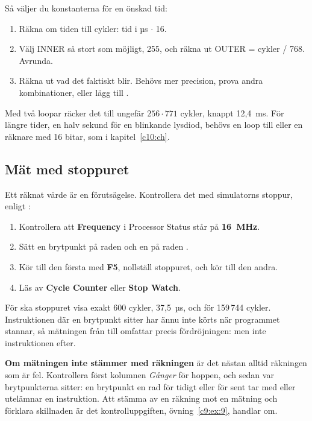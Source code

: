 Så väljer du konstanterna för en önskad tid:
\begin{enumerate}
  \item Räkna om tiden till cykler: tid i µs $\cdot$ 16.
  \item Välj INNER så stort som möjligt, 255, och räkna ut OUTER = cykler / 768. Avrunda.
  \item Räkna ut vad det faktiskt blir. Behövs mer precision, prova andra kombinationer, eller
    lägg till .
\end{enumerate}

Med två loopar räcker det till ungefär $256 \cdot 771$ cykler, knappt 12,4~ms. För längre tider, en
halv sekund för en blinkande lysdiod, behövs en loop till eller en räknare med 16 bitar, som i
kapitel~\ref{c10:ch}.

\subsection{Mät med stoppuret}
\label{c9:b6}
Ett räknat värde är en förutsägelse. Kontrollera det med simulatorns stoppur, enligt
:
\begin{enumerate}
  \item Kontrollera att \textbf{Frequency} i Processor Status står på \textbf{16~MHz}.
  \item Sätt en brytpunkt på raden  och en på raden .
  \item Kör till den första med \textbf{F5}, nollställ stoppuret, och kör till den andra.
  \item Läs av \textbf{Cycle Counter} eller \textbf{Stop Watch}.
\end{enumerate}

För  ska stoppuret visa exakt 600 cykler, 37,5~µs, och för
 159\,744 cykler. Instruktionen där en brytpunkt sitter har ännu inte körts
när programmet stannar, så mätningen från  till  omfattar precis
fördröjningen:  men inte instruktionen efter.

\textbf{Om mätningen inte stämmer med räkningen} är det nästan alltid räkningen som är fel.
Kontrollera först kolumnen \emph{Gånger} för hoppen, och sedan var brytpunkterna sitter: en
brytpunkt en rad för tidigt eller för sent tar med eller utelämnar en instruktion. Att stämma av en
räkning mot en mätning och förklara skillnaden är det kontrolluppgiften, övning~\ref{c9:ex:9},
handlar om.
